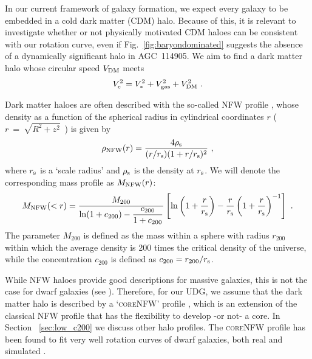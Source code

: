 \documentclass[fleqn,usenatbib]{mnras}
\begin{document}
In our current framework of galaxy formation, we expect every galaxy to be embedded in a cold dark matter (CDM) halo. Because of this, it is relevant to investigate whether or not physically motivated CDM haloes can be consistent with our rotation curve, even if Fig.~\ref{fig:baryondominated} suggests the absence of a dynamically significant halo in AGC~114905. We aim to find a dark matter halo whose circular speed $V_{\rm DM}$ meets
\begin{equation}
\label{eq:massmodel}
    V_{\rm c}^2 = V_\ast^2 + V_{\rm gas}^2 + V_{\rm DM}^2~.
\end{equation}


Dark matter haloes are often described with the so-called NFW profile \citep{nfw}, whose density as a function of the spherical radius in cylindrical coordinates $r$ ($r~=~\sqrt{R^2+z^2}$~) is given by
\begin{equation}
    \rho_{\rm NFW}(r) = \dfrac{4 \rho_{\rm s}}{(r/r_{\rm s})(1 + r/r_{\rm s})^2}~,
\end{equation}
where $r_{\rm s}$ is a `scale radius' and $\rho_{\rm s}$ is the density at $r_{\rm s}$. We will denote the corresponding mass profile as $M_{\rm NFW}(r)$:
\begin{equation}
    M_{\rm NFW}(<r) = \dfrac{M_{200}}{\ln(1+c_{200}) - \dfrac{c_{200}}{1+c_{200}}}\left[\ln\left( 1 + \dfrac{r}{r_{\rm s}}\right) - \dfrac{r}{r_{\rm s}} \left( 1 + \dfrac{r}{r_{\rm s}}\right)^{-1} \right]~.
\end{equation}
The parameter $M_{200}$ is defined as the mass within a sphere with radius $r_{200}$ within which the average density is 200 times the critical density of the universe, while the concentration $c_{200}$ is defined as $c_{200} = r_{200}/r_{\rm s}$.

While NFW haloes provide good descriptions for massive galaxies, this is not the case for dwarf galaxies (see \citealt{bullock2017}). Therefore, for our UDG, we assume that the dark matter halo is described by a `\textsc{core}NFW' profile \citep{coreNFW}, which is an extension of the classical NFW profile that has the flexibility to develop -or not- a core. In Section~ \ref{sec:low_c200} we discuss other halo profiles. The \textsc{core}NFW profile has been found to fit very well rotation curves of dwarf galaxies, both real and simulated \citep{coreNFW,readAD}.
\end{document}
